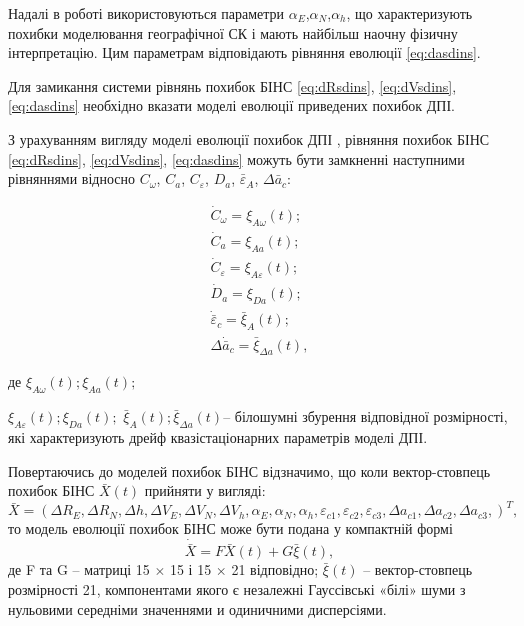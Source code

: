 Надалі в роботі використовуються параметри $\alpha_{E} $,$\alpha_{N} $,$\alpha_{h} $, 
що характеризують похибки  моделювання географічної СК і мають найбільш наочну 
фізичну інтерпретацію. Цим параметрам відповідають рівняння еволюції \eqref{eq:dasdins}.

Для замикання системи рівнянь похибок БІНС \eqref{eq:dRsdins}, \eqref{eq:dVsdins}, 
\eqref{eq:dasdins} необхідно вказати моделі еволюції приведених похибок ДПІ. 

З урахуванням вигляду моделі еволюції похибок ДПІ , 
рівняння похибок БІНС \eqref{eq:dRsdins}, \eqref{eq:dVsdins}, \eqref{eq:dasdins} 
можуть бути замкненні  наступними  рівняннями відносно 
$C_{\omega } $, $C_{a} $, $C_{\varepsilon} $, $D_{a} $, $\bar{\varepsilon }_{A} $, $\Delta \bar{a}_{c} $:

\begin{equation} \label{eq:dawsdins} \begin{array}{l} 
{\dot{C}_{\omega } =\xi_{A\omega } (t);} \\ 
{\dot{C}_{a} =\xi_{Aa} (t);} \\ 
{\dot{C}_{\varepsilon } =\xi_{A\varepsilon } (t);} \\ 
{\dot{D}_{a} =\xi_{Da}(t);} \\ 
{\dot{\bar{\varepsilon }}_{c} =\bar{\xi}_{A} (t);} \\ 
{\Delta \dot{\bar{a}}_{c} =\bar{\xi }_{\Delta a}(t),} \end{array} \end{equation} 
\begin{ESKDexplanation}
\item де $\xi_{A\omega } (t);$$\xi_{Aa} (t);$\item $\xi_{A\varepsilon } (t);$$\xi_{Da} (t);$
$\bar{\xi }_{A} (t);$$\bar{\xi }_{\Delta a} (t)$-- білошумні збурення відповідної розмірності, 
які характеризують дрейф квазістаціонарних  параметрів моделі ДПІ. %
\end{ESKDexplanation}
Повертаючись до моделей похибок БІНС відзначимо, що коли  вектор-стовпець похибок БІНС $\bar{X}(t)$ прийняти 
у вигляді:
\[\bar{X}=(\Delta R_{E} ,\Delta R_{N} ,\Delta h,\Delta V_{E} ,\Delta V_{N} ,\Delta 
V_{h} ,\alpha_{E} ,\alpha_{N} ,\alpha_{h} ,\varepsilon_{c1} ,\varepsilon_{c2} 
,\varepsilon_{c3} ,\Delta a_{c1} ,\Delta a_{c2} ,\Delta a_{c3} ,)^{T} ,\] 
то модель еволюції похибок БІНС може бути подана у компактній формі
\begin{equation} 
\label{eq:matrix_sdins} \dot{\bar{X}}=F\bar{X}\left(t\right)+G\bar{\xi }(t), 
\end{equation} 
де F та G   --  матриці 15 $\times$ 15 і 15 $\times$ 21 відповідно; $\bar{\xi }(t)$ -- вектор-стовпець 
розмірності 21, компонентами якого є незалежні Гауссівські «білі» шуми з нульовими 
середніми значеннями и одиничними дисперсіями.

